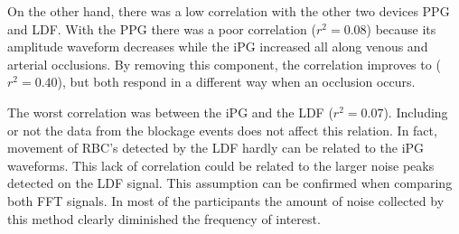 On the other hand, there was a low correlation with the other two devices PPG and LDF. With the PPG there was a poor correlation ($r^2 = 0.08$) because its amplitude waveform decreases while the iPG increased all along venous and arterial occlusions.  By removing this component, the correlation improves to ($r^2 = 0.40$), but both respond in a different way when an occlusion occurs.

The worst correlation was between the iPG and the LDF ($r^2 = 0.07$). Including or not the data from the blockage events does not affect this relation. In fact, movement of RBC's detected by the LDF hardly can be related to the iPG waveforms. This lack of correlation could be related to the larger noise peaks detected on the LDF signal. This assumption can be confirmed when comparing both FFT signals. In most of the participants the amount of noise collected by this method clearly diminished the frequency of interest. 


